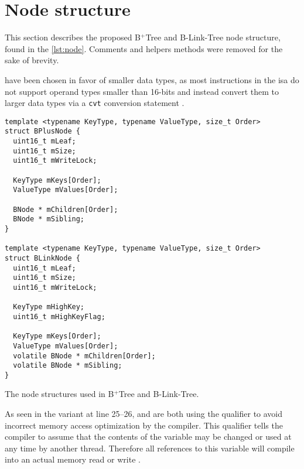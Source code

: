 \section{Node structure}

This section describes the proposed B$^+$Tree and B-Link-Tree node structure, found in the \cref{lst:node}. Comments and helpers methods were removed for the sake of brevity.

 have been chosen in favor of smaller data types, as most instructions in the \acrshort{isa} do not support operand types smaller than 16-bits and instead convert them to larger data types via a \texttt{cvt} conversion statement \cite{ptxisa}.

\pagebreak

\begin{listing}
  \begin{verbatim}
template <typename KeyType, typename ValueType, size_t Order>
struct BPlusNode {
  uint16_t mLeaf;
  uint16_t mSize;
  uint16_t mWriteLock;

  KeyType mKeys[Order];
  ValueType mValues[Order];

  BNode * mChildren[Order]; 
  BNode * mSibling;
}

template <typename KeyType, typename ValueType, size_t Order>
struct BLinkNode {
  uint16_t mLeaf;
  uint16_t mSize;
  uint16_t mWriteLock;

  KeyType mHighKey;
  uint16_t mHighKeyFlag;

  KeyType mKeys[Order];
  ValueType mValues[Order];
  volatile BNode * mChildren[Order]; 
  volatile BNode * mSibling;
}
    \end{verbatim}
  \caption[B$^+$Tree and B-Link-Tree node structures]{The node structures used in B$^+$Tree and B-Link-Tree.}
  \label{lst:node}
\end{listing}

As seen in the  variant at line 25--26,  and  are both using the  qualifier to avoid incorrect memory access optimization by the compiler. This qualifier tells the compiler to assume that the contents of the variable may be changed or used at any time by another thread. Therefore all references to this variable will compile into an actual memory read or write \cite{cudaprog}.